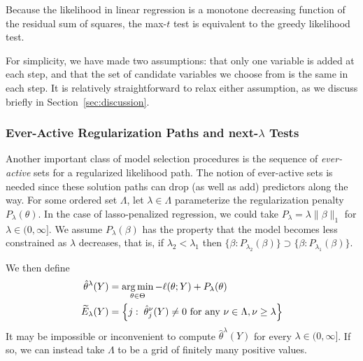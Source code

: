 \documentclass{article}
\begin{document}
Because the likelihood in linear regression is a monotone decreasing function of the residual sum of squares, the max-$t$ test is equivalent to the greedy likelihood test.

For simplicity, we have made two assumptions: that only one variable is added at each step, and that the set of candidate variables we choose from is the same in each step. It is relatively straightforward to relax either assumption, as we discuss briefly in Section~\ref{sec:discussion}.

\subsubsection{Ever-Active Regularization Paths and next-$\lambda$ Tests}
Another important class of model selection procedures is the sequence of {\em ever-active} sets for a regularized likelihood path. 
The notion of ever-active sets is needed since these solution paths can drop  (as well as add) predictors along the way. 	For some ordered set $\Lambda$, let $\lambda\in\Lambda$ parameterize the regularization penalty $P_\lambda(\theta)$. In the case of lasso-penalized regression, we could take $P_\lambda = \lambda\|\beta\|_1$ for $\lambda\in (0,\infty]$. 
We assume $P_\lambda(\beta)$  has the property  that the model becomes less constrained as $\lambda$ decreases, that is,
 if $\lambda_2<\lambda_1$ then $\{\beta:P_{\lambda_2}(\beta)\} \supset \{\beta:P_{\lambda_1}(\beta)\}$.   

We then define
\begin{align}
  \hat\theta^{\lambda}(Y) &= 
  \operatorname*{arg\,min}_{\theta\in\Theta} -\ell(\theta; Y) + P_\lambda(\theta) \\
  \widetilde{E}_\lambda(Y) &= \left\{j:\; \hat\theta_j^\nu(Y) \neq 0 
    \text{ for any } \nu\in \Lambda, \nu \geq \lambda \right\}
\end{align}
It may be impossible or inconvenient to compute $\hat\theta^\lambda(Y)$ for every $\lambda\in(0,\infty]$. If so, we can instead take $\Lambda$ to be a grid of finitely many positive values.
\end{document}
